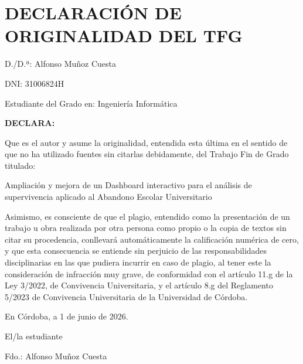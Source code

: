 \clearpage
\section*{DECLARACIÓN DE ORIGINALIDAD DEL TFG}

\noindent
D./D.ª: Alfonso Muñoz Cuesta

\noindent
DNI: 31006824H

\noindent
Estudiante del Grado en: Ingeniería Informática

\vspace{0.5cm}

\noindent
\textbf{DECLARA:}

\vspace{0.3cm}

\noindent
Que es el autor y asume la originalidad, entendida esta última en el sentido de que no ha utilizado fuentes sin citarlas debidamente, del Trabajo Fin de Grado titulado:

\vspace{0.3cm}

\noindent
Ampliación y mejora de un Dashboard interactivo para el análisis de supervivencia aplicado al Abandono Escolar Universitario

\vspace{0.3cm}


\noindent
Asimismo, es consciente de que el plagio, entendido como la presentación de un trabajo u obra realizada por otra persona como propio o la copia de textos sin citar su procedencia, conllevará automáticamente la calificación numérica de cero, y que esta consecuencia se entiende sin perjuicio de las responsabilidades disciplinarias en las que pudiera incurrir en caso de plagio, al tener este la consideración de infracción muy grave, de conformidad con el artículo 11.g de la Ley 3/2022, de Convivencia Universitaria, y el artículo 8.g del Reglamento 5/2023 de Convivencia Universitaria de la Universidad de Córdoba.

\vspace{0.8cm}

\noindent
En Córdoba, a 1 de junio de 2026.

\vspace{1.5cm}

\noindent
El/la estudiante

\vspace{2cm}

\noindent
Fdo.: Alfonso Muñoz Cuesta
\newpage

